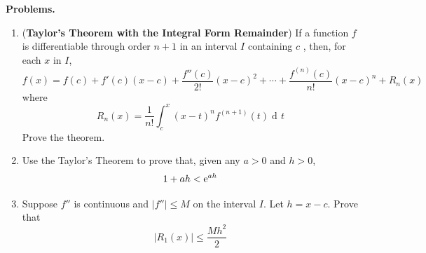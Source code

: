 \documentclass[10pt]{article}
\title{}
\date{}
\newcommand{\e}{{\rm e}}
\newcommand{\abs}[1]{\lvert #1 \rvert}
\DeclareMathOperator{\xd}{d\!}
\begin{document}
\noindent
{\bf Problems.}
\begin{enumerate}
\item ({\bf Taylor's Theorem with the Integral Form Remainder}) If a function $f$  is differentiable through order $n+1$ in an interval $I$  containing $c$ , then, for each $x$ in $I$,
\[
	f(x) = f(c) + f'(c)(x-c) + \frac{f''(c)}{2!}(x-c)^2 + \cdots + \frac{f^{(n)}(c)}{n!}(x-c)^n + R_n(x)
\]
where
\[
R_n(x) = \frac{1}{n!}\int_c^x(x-t)^nf^{(n+1)}(t)\xd t
\]
Prove the theorem.
\clearpage
\item Use the Taylor's Theorem to prove that, given any $a >0$ and $h>0$, 
\[
	1 + ah < \e^{ah}
\]
\item
Suppose $f''$ is continuous and $\abs{f''} \leq M$ on the interval $I$. Let $h = x - c$. Prove that
\[
\abs{R_1(x)} \leq \frac{Mh^2}{2}
\]
\end{enumerate}
\end{document}
